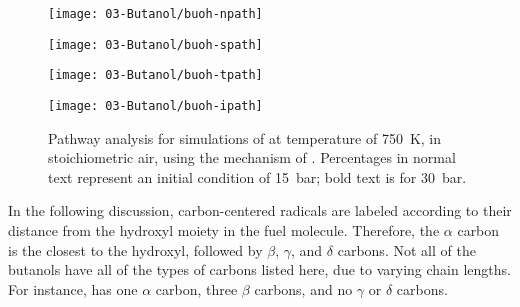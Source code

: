 \documentclass[12pt, letterpaper]{article}
\begin{document}
\begin{figure}
    \begin{floatrow}
    \ffigbox
        {\texttt{[image: 03-Butanol/buoh-npath]}}
        {\caption{Pathway analysis for simulations of \nBuOH{} at
            temperature of \SI{750}{\kelvin}, in stoichiometric air, using the mechanism of
            \textcite{Sarathy2012}. Percentages in normal text represent an
            initial condition of \SI{15}{\bar}; bold text is for \SI{30}{\bar}.}
        \label{fig:buoh-npath}}
    \ffigbox
        {\texttt{[image: 03-Butanol/buoh-spath]}}
        {\caption{Pathway analysis for simulations of \sBuOH{} at
            temperature of \SI{750}{\kelvin}, in stoichiometric air, using the mechanism of
            \textcite{Sarathy2012}. Percentages in normal text represent an
            initial condition of \SI{15}{\bar}; bold text is for \SI{30}{\bar}.}
        \label{fig:buoh-spath}}
    \end{floatrow}
    \par
    \begin{floatrow}
    \ffigbox
        {\texttt{[image: 03-Butanol/buoh-tpath]}}
        {\caption{Pathway analysis for simulations of \tBuOH{} at
            temperature of \SI{750}{\kelvin}, in stoichiometric air, using the mechanism of
            \textcite{Sarathy2012}. Percentages in normal text represent an
            initial condition of \SI{15}{\bar}; bold text is for \SI{30}{\bar}.}
        \label{fig:buoh-tpath}}
    \ffigbox
        {\texttt{[image: 03-Butanol/buoh-ipath]}}
        {\caption{Pathway analysis for simulations of \iBuOH{} at
            temperature of \SI{750}{\kelvin}, in stoichiometric air, using the mechanism of
            \textcite{Sarathy2012}. Percentages in normal text represent an
            initial condition of \SI{15}{\bar}; bold text is for \SI{30}{\bar}.}
        \label{fig:buoh-ipath}}
    \end{floatrow}
\end{figure}

In the following discussion, carbon-centered radicals are labeled according to
their distance from the hydroxyl moiety in the fuel molecule. Therefore, the
$\alpha$ carbon is the closest to the hydroxyl, followed by $\beta$, $\gamma$,
and $\delta$ carbons. Not all of the butanols have all of the types of carbons
listed here, due to varying chain lengths. For instance, \tBuOH{} has
one $\alpha$ carbon, three $\beta$ carbons, and no $\gamma$ or $\delta$ carbons.
\end{document}
